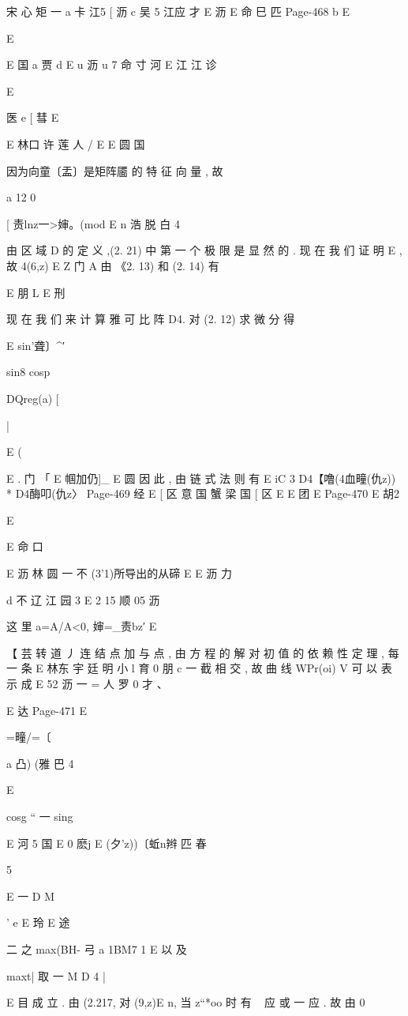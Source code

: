 {{{宋 心 矩 一 a
卡 江5 [ 沥
c
吴 5 江应 才
E 沥
E 命 巳 匹
Page-468
b E

E

E 国 a 贾 d
E u 沥 u 7 命 寸 河
E 江 江 诊

E

医 e [ 彗 E

E 林口 许 莲 人 /
E E 圆 国

因为向童〔盂〕是矩阵靥 的 特 征 向 量 , 故

a 12
0

[ 责lnz一>婶。(mod E n 浩 脱 白 4

由 区 域 D 的 定 义 ,(2. 21) 中 第 一 个 极 限 是 显 然 的 . 现 在 我 们 证 明
E , 故 4(6,z) E Z 门 A 由
《2. 13) 和 (2. 14) 有

E 朋
L
E 刑

现 在 我 们 来 计 算 雅 可 比 阵 D4. 对 (2. 12) 求 微 分 得

E sin'聋〕^′

sin8 cosp

DQreg(a) [

|

E (

E .
门 「 E 帼加仍]_
E 圆
因 此 , 由 链 式 法 则 有
E iC 3 D4【噜(4血疃(仇z)) * D4酶叩(仇z〉
Page-469
经
E
[
区
意
国
蟹
梁
国
[
区
E
E
团
E
Page-470
E 胡2

E

E 命 口

E 沥 林 圆 一 不
(3'1)所导出的从碲 E
E 沥 力

d 不 辽 江 园 3
E 2 15 顺 05 沥

这 里 a=A/A<0, 婶=_责bz′ E

【 芸
转 道 丿 连 结 点 加 与 点 , 由 方 程 的 解 对 初 值 的 依 赖 性 定 理 , 每 一 条
E 林东
宇 廷 明 小 l 育 0 朋
c 一
截 相 交 , 故 曲 线 WPr(oi) V 可 以 表 示 成
E 52 沥 一 = 人 罗 0 才 、

E 达
Page-471
E

=疃/=〔

a 凸) (雅 巴
4

E

cosg “ 一 sing

E 河 5
国 E
0 麽j E (夕'z))〔蚯n辫 匹 春

5

E
一 D M}'
e
E
玲
E 途

二 之 max(BH- 弓 a 1BM7 1 E
以 及

maxt| 取 一 M D 4 |

E 目
成 立 . 由 (2.217, 对 (9,z)E n, 当 z“*oo 时 有 ~ 应 或 一 应 . 故 由
0

}}
